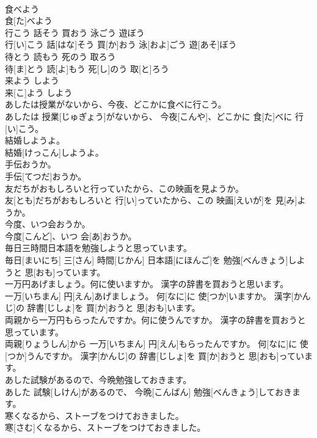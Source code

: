 \documentclass[8pt]{extreport}
\begin{document}
\begin{CJK}{UTF8}{min}
\\	食べよう	
\\	食[た]べよう	
\\	行こう 話そう 買おう 泳ごう 遊ぼう	
\\	行[い]こう 話[はな]そう 買[か]おう 泳[およ]ごう 遊[あそ]ぼう	
\\	待とう 読もう 死のう 取ろう	
\\	待[ま]とう 読[よ]もう 死[し]のう 取[と]ろう	
\\	来よう しよう	
\\	来[こ]よう しよう	
\\	あしたは授業がないから、今夜、どこかに食べに行こう。	
\\	あしたは 授業[じゅぎょう]がないから、 今夜[こんや]、どこかに 食[た]べに 行[い]こう。	
\\	結婚しようよ。	
\\	結婚[けっこん]しようよ。	
\\	手伝おうか。	
\\	手伝[てつだ]おうか。	
\\	友だちがおもしろいと行っていたから、この映画を見ようか。	
\\	友[とも]だちがおもしろいと 行[い]っていたから、この 映画[えいが]を 見[み]ようか。	
\\	今度、いつ会おうか。	
\\	今度[こんど]、いつ 会[あ]おうか。	
\\	毎日三時間日本語を勉強しようと思っています。	
\\	毎日[まいにち] 三[さん] 時間[じかん] 日本語[にほんご]を 勉強[べんきょう]しようと 思[おも]っています。	
\\	一万円あげましょう。何に使いますか。 漢字の辞書を買おうと思います。	
\\	一万[いちまん] 円[えん]あげましょう。 何[なに]に 使[つか]いますか。 漢字[かんじ]の 辞書[じしょ]を 買[か]おうと 思[おも]います。	
\\	両親から一万円もらったんですか。何に使うんですか。 漢字の辞書を買おうと思っています。	
\\	両親[りょうしん]から 一万[いちまん] 円[えん]もらったんですか。 何[なに]に 使[つか]うんですか。 漢字[かんじ]の 辞書[じしょ]を 買[か]おうと 思[おも]っています。	
\\	あした試験があるので、今晩勉強しておきます。	
\\	あした 試験[しけん]があるので、 今晩[こんばん] 勉強[べんきょう]しておきます。	
\\	寒くなるから、ストーブをつけておきました。	
\\	寒[さむ]くなるから、ストーブをつけておきました。	

\end{CJK}
\end{document}
